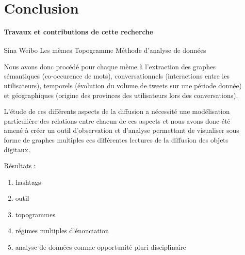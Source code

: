 \chapter*{Conclusion}



\subsubsection[Travaux et contributions de cette recherche]{Travaux et contributions de cette recherche}

Sina Weibo
Les mèmes
Topogramme
Méthode d'analyse de données

Nous avons donc procédé pour chaque mème à l{\textquoteright}extraction des graphes sémantiques (co-occurence de mots), conversationnels (interactions entre les utilisateurs), temporels (évolution du volume de tweets sur une période donnée) et géographiques (origine des provinces des utilisateurs lors des conversations). 

L{\textquoteright}étude de ces différents aspects de la diffusion a nécessité une modélisation particulière des relations entre chacun de ces aspects et nous avons donc été amené à créer un outil d{\textquoteright}observation et d{\textquoteright}analyse permettant de visualiser sous forme de graphes multiples ces différentes lectures de la diffusion des objets digitaux.

Résultats :
\begin{enumerate}
    \item{hashtags}
    \item{outil}
    \item{topogrammes}
    \item{régimes multiples d'énonciation}
    \item{analyse de données comme opportunité pluri-disciplinaire}
\end{enumerate}


